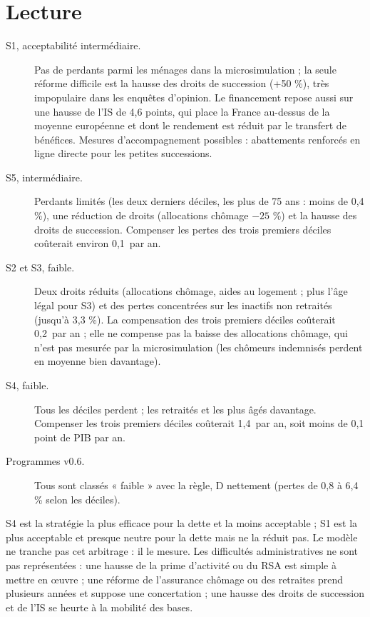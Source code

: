 \begin{table}[htbp]\centering\scriptsize
\caption{Acceptabilité et variation du niveau de vie de quelques déciles (€ par unité de consommation et par an).}\label{tab:accept}
\end{table}

\section{Lecture}

\begin{description}
\item[S1, acceptabilité intermédiaire.] Pas de perdants parmi les ménages dans la microsimulation ; la seule réforme
difficile est la hausse des droits de succession (+50 \%), très impopulaire dans les enquêtes d'opinion. Le
financement repose aussi sur une hausse de l'IS de 4,6 points, qui place la France au-dessus de la moyenne européenne
et dont le rendement est réduit par le transfert de bénéfices. Mesures d'accompagnement possibles : abattements
renforcés en ligne directe pour les petites successions.
\item[S5, intermédiaire.] Perdants limités (les deux derniers déciles, les plus de 75 ans : moins de 0,4 \%), une
réduction de droits (allocations chômage $-25$ \%) et la hausse des droits de succession. Compenser les pertes des
trois premiers déciles coûterait environ 0,1\md\ par an.
\item[S2 et S3, faible.] Deux droits réduits (allocations chômage, aides au logement ; plus l'âge légal pour S3) et
des pertes concentrées sur les inactifs non retraités (jusqu'à 3,3 \%). La compensation des trois premiers déciles
coûterait 0,2\md\ par an ; elle ne compense pas la baisse des allocations chômage, qui n'est pas mesurée par la
microsimulation (les chômeurs indemnisés perdent en moyenne bien davantage).
\item[S4, faible.] Tous les déciles perdent ; les retraités et les plus âgés davantage. Compenser les trois premiers
déciles coûterait 1,4\md\ par an, soit moins de 0,1 point de PIB par an.
\item[Programmes v0.6.] Tous sont classés « faible » avec la règle, D nettement (pertes de 0,8 à 6,4 \% selon les
déciles).
\end{description}

\begin{hypothese}
S4 est la stratégie la plus efficace pour la dette et la moins acceptable ; S1 est la plus acceptable et presque
neutre pour la dette mais ne la réduit pas. Le modèle ne tranche pas cet arbitrage : il le mesure. Les difficultés
administratives ne sont pas représentées : une hausse de la prime d'activité ou du RSA est simple à mettre en œuvre ; une
réforme de l'assurance chômage ou des retraites prend plusieurs années et suppose une concertation ; une hausse des
droits de succession et de l'IS se heurte à la mobilité des bases.
\end{hypothese}

